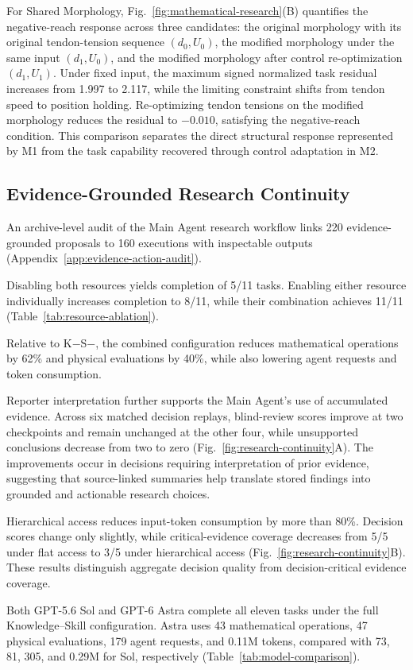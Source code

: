 

For Shared Morphology, Fig.~\ref{fig:mathematical-research}(B) quantifies the negative-reach response across three candidates: the original morphology with its original tendon-tension sequence $(d_0,U_0)$, the modified morphology under the same input $(d_1,U_0)$, and the modified morphology after control re-optimization $(d_1,U_1)$. Under fixed input, the maximum signed normalized task residual increases from 1.997 to 2.117, while the limiting constraint shifts from tendon speed to position holding. Re-optimizing tendon tensions on the modified morphology reduces the residual to $-0.010$, satisfying the negative-reach condition. This comparison separates the direct structural response represented by M1 from the task capability recovered through control adaptation in M2.

\subsection{Evidence-Grounded Research Continuity}
\label{subsec:ablation-studies}
\label{subsec:architecture-ablation}

An archive-level audit of the Main Agent research workflow links 220 evidence-grounded proposals to 160 executions with inspectable outputs (Appendix~\ref{app:evidence-action-audit}).

Disabling both resources yields completion of 5/11 tasks. Enabling either resource individually increases completion to 8/11, while their combination achieves 11/11 (Table~\ref{tab:resource-ablation}).



Relative to K$-$S$-$, the combined configuration reduces mathematical operations by 62\% and physical evaluations by 40\%, while also lowering agent requests and token consumption.

Reporter interpretation further supports the Main Agent's use of accumulated evidence. Across six matched decision replays, blind-review scores improve at two checkpoints and remain unchanged at the other four, while unsupported conclusions decrease from two to zero (Fig.~\ref{fig:research-continuity}A). The improvements occur in decisions requiring interpretation of prior evidence, suggesting that source-linked summaries help translate stored findings into grounded and actionable research choices.

Hierarchical access reduces input-token consumption by more than 80\%. Decision scores change only slightly, while critical-evidence coverage decreases from 5/5 under flat access to 3/5 under hierarchical access (Fig.~\ref{fig:research-continuity}B). These results distinguish aggregate decision quality from decision-critical evidence coverage.



Both GPT-5.6 Sol and GPT-6 Astra complete all eleven tasks under the full Knowledge--Skill configuration. Astra uses 43 mathematical operations, 47 physical evaluations, 179 agent requests, and 0.11M tokens, compared with 73, 81, 305, and 0.29M for Sol, respectively (Table~\ref{tab:model-comparison}).


